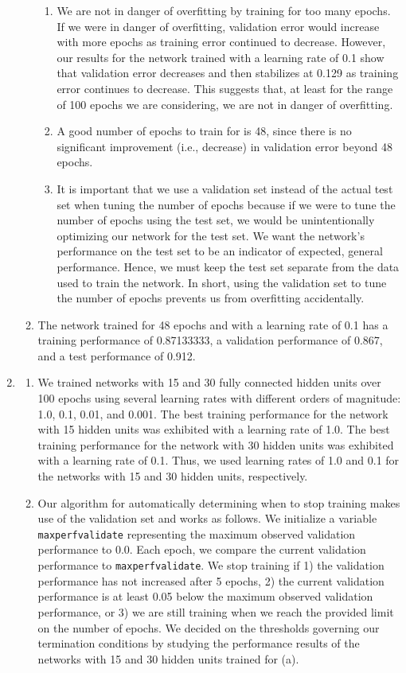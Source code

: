 \documentclass[solution, letterpaper]{cs121}
\begin{document}
\begin{enumerate}
\begin{enumerate}
\begin{enumerate}
				\item We are not in danger of overfitting by training for too many epochs. If we were in danger of overfitting, validation error would increase with more epochs as training error continued to decrease. However, our results for the network trained with a learning rate of 0.1 show that validation error decreases and then stabilizes at 0.129 as training error continues to decrease. This suggests that, at least for the range of 100 epochs we are considering, we are not in danger of overfitting. 
				\item A good number of epochs to train for is 48, since there is no significant improvement (i.e., decrease) in validation error beyond 48 epochs.
				\item It is important that we use a validation set instead of the actual test set when tuning the number of epochs because if we were to tune the number of epochs using the test set, we would be unintentionally optimizing our network for the test set. We want the network's performance on the test set to be an indicator of expected, general performance. Hence, we must keep the test set separate from the data used to train the network. In short, using the validation set to tune the number of epochs prevents us from overfitting accidentally.
			\end{enumerate}
		\item The network trained for 48 epochs and with a learning rate of 0.1 has a training performance of 0.87133333, a validation performance of 0.867, and a test performance of 0.912.
		\end{enumerate}
	\item
		\begin{enumerate}
			\item We trained networks with 15 and 30 fully connected hidden units over 100 epochs using several learning rates with different orders of magnitude: 1.0, 0.1, 0.01, and 0.001. The best training performance for the network with 15 hidden units was exhibited with a learning rate of 1.0. The best training performance for the network with 30 hidden units was exhibited with a learning rate of 0.1. Thus, we used learning rates of 1.0 and 0.1 for the networks with 15 and 30 hidden units, respectively.
			\item Our algorithm for automatically determining when to stop training makes use of the validation set and works as follows. We initialize a variable {\tt max\textunderscore perf\textunderscore validate} representing the maximum observed validation performance to 0.0. Each epoch, we compare the current validation performance to {\tt max\textunderscore perf\textunderscore validate}. We stop training if 1) the validation performance has not increased after 5 epochs, 2) the current validation performance is at least 0.05 below the maximum observed validation performance, or 3) we are still training when we reach the provided limit on the number of epochs. We decided on the thresholds governing our termination conditions by studying the performance results of the networks with 15 and 30 hidden units trained for (a).

\end{enumerate}
\end{enumerate}
\end{document}
